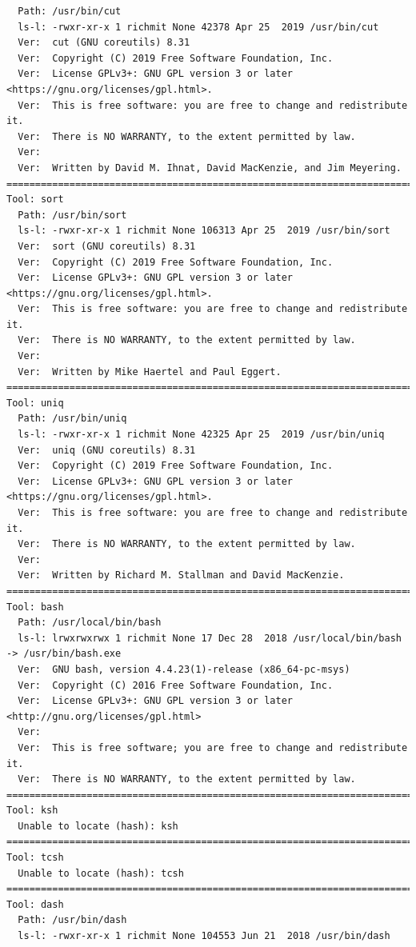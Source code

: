 \documentclass[11pt]{article}
\begin{document}
\begin{verbatim}
  Path: /usr/bin/cut
  ls-l: -rwxr-xr-x 1 richmit None 42378 Apr 25  2019 /usr/bin/cut
  Ver:  cut (GNU coreutils) 8.31
  Ver:  Copyright (C) 2019 Free Software Foundation, Inc.
  Ver:  License GPLv3+: GNU GPL version 3 or later <https://gnu.org/licenses/gpl.html>.
  Ver:  This is free software: you are free to change and redistribute it.
  Ver:  There is NO WARRANTY, to the extent permitted by law.
  Ver:  
  Ver:  Written by David M. Ihnat, David MacKenzie, and Jim Meyering.
==========================================================================================
Tool: sort
  Path: /usr/bin/sort
  ls-l: -rwxr-xr-x 1 richmit None 106313 Apr 25  2019 /usr/bin/sort
  Ver:  sort (GNU coreutils) 8.31
  Ver:  Copyright (C) 2019 Free Software Foundation, Inc.
  Ver:  License GPLv3+: GNU GPL version 3 or later <https://gnu.org/licenses/gpl.html>.
  Ver:  This is free software: you are free to change and redistribute it.
  Ver:  There is NO WARRANTY, to the extent permitted by law.
  Ver:  
  Ver:  Written by Mike Haertel and Paul Eggert.
==========================================================================================
Tool: uniq
  Path: /usr/bin/uniq
  ls-l: -rwxr-xr-x 1 richmit None 42325 Apr 25  2019 /usr/bin/uniq
  Ver:  uniq (GNU coreutils) 8.31
  Ver:  Copyright (C) 2019 Free Software Foundation, Inc.
  Ver:  License GPLv3+: GNU GPL version 3 or later <https://gnu.org/licenses/gpl.html>.
  Ver:  This is free software: you are free to change and redistribute it.
  Ver:  There is NO WARRANTY, to the extent permitted by law.
  Ver:  
  Ver:  Written by Richard M. Stallman and David MacKenzie.
==========================================================================================
Tool: bash
  Path: /usr/local/bin/bash
  ls-l: lrwxrwxrwx 1 richmit None 17 Dec 28  2018 /usr/local/bin/bash -> /usr/bin/bash.exe
  Ver:  GNU bash, version 4.4.23(1)-release (x86_64-pc-msys)
  Ver:  Copyright (C) 2016 Free Software Foundation, Inc.
  Ver:  License GPLv3+: GNU GPL version 3 or later <http://gnu.org/licenses/gpl.html>
  Ver:  
  Ver:  This is free software; you are free to change and redistribute it.
  Ver:  There is NO WARRANTY, to the extent permitted by law.
==========================================================================================
Tool: ksh
  Unable to locate (hash): ksh
==========================================================================================
Tool: tcsh
  Unable to locate (hash): tcsh
==========================================================================================
Tool: dash
  Path: /usr/bin/dash
  ls-l: -rwxr-xr-x 1 richmit None 104553 Jun 21  2018 /usr/bin/dash

\end{verbatim}
\end{document}

